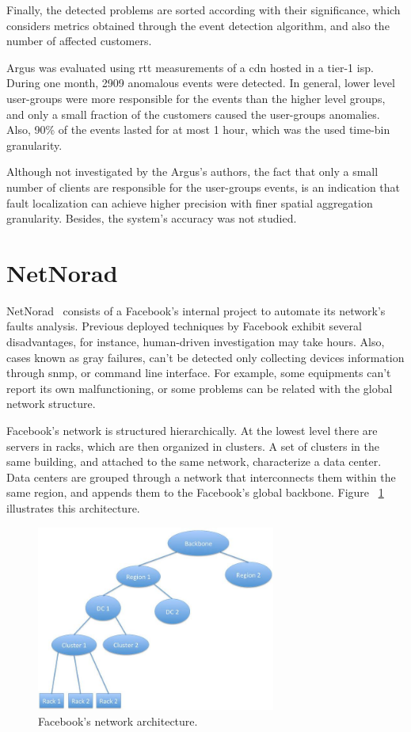 Finally, the detected problems are sorted according with
their significance, which considers metrics obtained
through the event detection
algorithm, and also the number of affected customers.

Argus was evaluated using \gls*{rtt} measurements of a \gls*{cdn} hosted in a
tier-1 \gls*{isp}\@.
During one month, 2909 anomalous events were detected.
In general, lower level user-groups were more responsible
for the events than the higher level groups,
and only a small fraction of the customers caused the user-groups anomalies.
Also, 90\% of the events lasted for
at most 1 hour, which was the used time-bin granularity.

Although not investigated by the Argus's authors, the fact that only a
small number
of clients are responsible for the user-groups events, is an indication that
fault localization can achieve higher precision
with finer spatial aggregation granularity. Besides, the system's accuracy was
not studied.

\section{NetNorad}

NetNorad~\cite{netnorad} consists of a Facebook's internal project to
automate its network's faults analysis.
Previous deployed techniques by Facebook exhibit several
disadvantages, for instance,
human-driven investigation may take hours. Also, cases known as gray failures,
can't be detected only collecting devices information through \gls*{snmp},
or command line interface.
For example, some equipments can't report its own malfunctioning, or
some problems can be related with the global network structure.

Facebook's network is structured hierarchically. At the
lowest level there are servers in racks, which are then organized in
clusters. A set of clusters in the same building, and attached to
the same network, characterize a data center. Data centers are grouped
through a network that interconnects them within the same region, and appends
them to the Facebook's global backbone. Figure
~\ref{fig:netnorad_network_architecture} illustrates this architecture.

\begin{figure}[H]
    \centering
    \includegraphics[width=0.7\textwidth]{./figures/literature_review/netnorad_network_architecture.jpg}
    \caption{Facebook's network architecture.~\cite{netnorad}}
\label{fig:netnorad_network_architecture}
\end{figure}%

